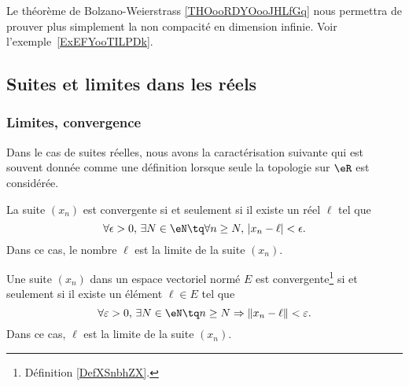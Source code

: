 Le théorème de Bolzano-Weierstrass \ref{THOooRDYOooJHLfGq} nous permettra de prouver plus simplement la non compacité en dimension infinie. Voir l'exemple~\ref{ExEFYooTILPDk}.

\subsection{Suites et limites dans les réels}

\subsubsection{Limites, convergence}

Dans le cas de suites réelles, nous avons la caractérisation suivante qui est souvent donnée comme une définition lorsque seule la topologie sur \( \eR\) est considérée.
\begin{proposition}   \label{PropLimiteSuiteNum}
	La suite \( (x_n)\) est convergente si et seulement si il existe un réel \( \ell\) tel que
	\begin{equation}          \label{EqDefLimSuite}
		\forall \epsilon>0,\,\exists N\in\eN\tq\forall n\geq N,\,| x_n-\ell |<\epsilon.
	\end{equation}
	Dans ce cas, le nombre \( \ell\) est la limite de la suite \( (x_n)\).
\end{proposition}

\begin{proposition}     \label{PROPooOSXCooJWXkWH}
	Une suite \( (x_n)\) dans un espace vectoriel normé \( E\) est convergente\footnote{Définition \ref{DefXSnbhZX}.} si et seulement si il existe un élément \( \ell\in E\) tel que
	\begin{equation}
		\forall \varepsilon>0,\,\exists N\in\eN\tq n\geq N\Rightarrow \| x_n-\ell \|<\varepsilon.
	\end{equation}
	Dans ce cas, \( \ell\) est la limite de la suite \( (x_n)\).
\end{proposition}

